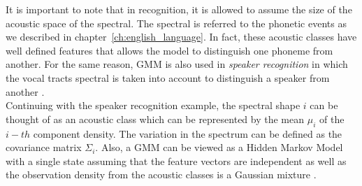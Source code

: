 \begin{comment}
\begin{figure}[!ht]
	\centering
	\texttt{[image: Figures/gmm\_example.png]}
	\caption{Example of clustering using Gaussian Mixture Model}
	\label{fig:gmm_example}
\end{figure}
\end{comment}

\noindent It is important to note that in recognition, it is allowed to assume the size of the acoustic space of the spectral. The spectral is referred to the phonetic events as we described in chapter~\ref{ch:english_language}. In fact, these acoustic classes have well defined features that allows the model to distinguish one phoneme from another. For the same reason, GMM is also used in \textit{speaker recognition} in which the vocal tracts spectral is taken into account to distinguish a speaker from another \cite{reynolds1992gaussian}. \\

\noindent Continuing with the speaker recognition example, the spectral shape $i$ can be thought of as an acoustic class which can be represented by the mean $\mu_{i}$ of the $i-th$ component density. The variation in the spectrum can be defined as the covariance matrix $\Sigma_{i}$. Also, a GMM can be viewed as a Hidden Markov Model with a single state assuming that the feature vectors are independent as well as the observation density from the acoustic classes is a Gaussian mixture \cite{reynolds2000speaker} \cite{reynolds1995robust}.
